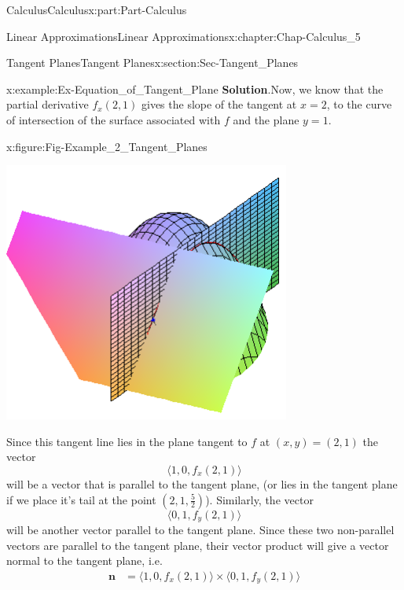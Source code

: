 \documentclass[oneside,10pt,]{book}
\newcommand{\blocktitlefont}{\relax}
\numberwithin{equation}{section}
\newcommand{\bm}[1]{\boldsymbol{#1}}
\newcommand{\amp}{&}
\begin{document}
\begin{partptx}{Calculus}{}{Calculus}{}{}{x:part:Part-Calculus}
\begin{chapterptx}{Linear Approximations}{}{Linear Approximations}{}{}{x:chapter:Chap-Calculus_5}
\begin{sectionptx}{Tangent Planes}{}{Tangent Planes}{}{}{x:section:Sec-Tangent_Planes}
\begin{example}{}{x:example:Ex-Equation_of_Tangent_Plane}
\noindent\textbf{\blocktitlefont Solution}.\hypertarget{g:solution:id548460}{}\quad{}Now, we know that the partial derivative \(f_x(2,1)\) gives the slope of the tangent at \(x=2\), to the curve of intersection of the surface associated with \(f\) and the plane \(y=1\).%
\begin{figureptx}{}{x:figure:Fig-Example_2_Tangent_Planes}{}%
\begin{image}{0.15}{0.7}{0.15}%
\includegraphics[width=\linewidth]{./Calculus/Images/5/Ex2_Tangent_Planes.png}
\end{image}%
\tcblower
\end{figureptx}%
Since this tangent line lies in the plane tangent to \(f\) at \((x,y) = (2,1)\) the vector%
\begin{equation*}
\langle 1,0,f_x(2,1) \rangle
\end{equation*}
will be a vector that is parallel to the tangent plane, (or lies in the tangent plane if we place it’s tail at the point \((2,1,\frac{5}{2})\)). Similarly, the vector%
\begin{equation*}
\langle 0,1,f_y(2,1) \rangle
\end{equation*}
will be another vector parallel to the tangent plane. Since these two non-parallel vectors are parallel to the tangent plane, their vector product will give a vector normal to the tangent plane, i.e.%
\begin{align*}
\bm{n} \amp = \langle 1,0,f_x(2,1) \rangle \times \langle 0,1,f_y(2,1) \rangle\\

\end{align*}
\end{example}
\end{sectionptx}
\end{chapterptx}
\end{partptx}
\end{document}
